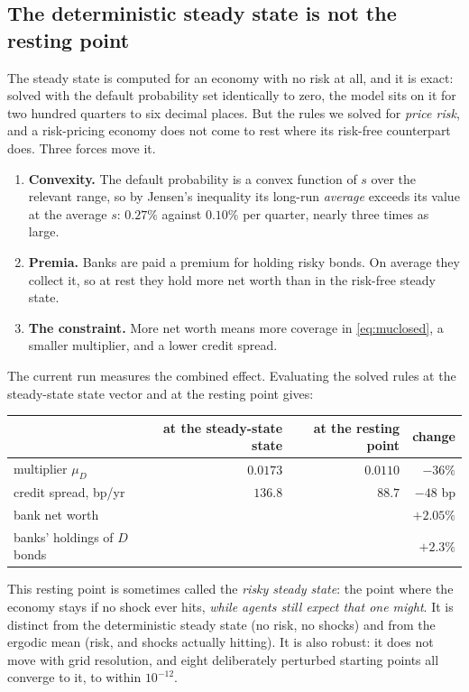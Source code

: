 \documentclass[10pt,a4paper]{article}
\theoremstyle{plain}
\theoremstyle{remark}
\begin{document}
\subsection{The deterministic steady state is not the resting point}

The steady state is computed for an economy with no risk at all, and it is exact: solved with the
default probability set identically to zero, the model sits on it for two hundred quarters to six
decimal places. But the rules we solved for \emph{price risk}, and a risk-pricing economy does not
come to rest where its risk-free counterpart does. Three forces move it.

\begin{enumerate}
\item \textbf{Convexity.} The default probability is a convex function of $s$ over the relevant range,
so by Jensen's inequality its long-run \emph{average} exceeds its value at the average $s$: $0.27\%$
against $0.10\%$ per quarter, nearly three times as large.
\item \textbf{Premia.} Banks are paid a premium for holding risky bonds. On average they collect it,
so at rest they hold more net worth than in the risk-free steady state.
\item \textbf{The constraint.} More net worth means more coverage in \eqref{eq:muclosed}, a smaller
multiplier, and a lower credit spread.
\end{enumerate}

\noindent The current run measures the combined effect. Evaluating the solved rules at the
steady-state state vector and at the resting point gives:

\begin{center}\small
\begin{tabular}{@{}lrrr@{}}
\toprule
 & at the steady-state state & at the resting point & change \\
\midrule
multiplier $\mu_D$ & $0.0173$ & $0.0110$ & $-36\%$ \\
credit spread, bp/yr & $136.8$ & $88.7$ & $-48$ bp \\
bank net worth & & & $+2.05\%$ \\
banks' holdings of $D$ bonds & & & $+2.3\%$ \\
\bottomrule
\end{tabular}
\end{center}

\noindent This resting point is sometimes called the \emph{risky steady state}: the point where the
economy stays if no shock ever hits, \emph{while agents still expect that one might}. It is distinct
from the deterministic steady state (no risk, no shocks) and from the ergodic mean (risk, and shocks
actually hitting). It is also robust: it does not move with grid resolution, and eight deliberately
perturbed starting points all converge to it, to within $10^{-12}$.
\end{document}
